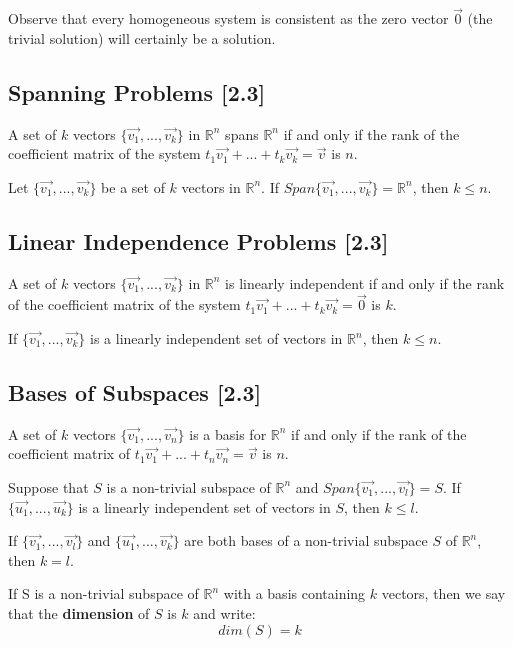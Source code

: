 \documentclass[a4paper,9pt]{extarticle}
\begin{document}
\begin{multicols*}{2}
Observe that every homogeneous system is consistent as the zero vector $\vec{0}$ (the trivial solution) will certainly be a solution.


\subsection{Spanning Problems [2.3]}
A set of $k$ vectors $\{\vec{v_1}, ... ,\vec{v_k}\}$ in $\mathbb{R}^n$ spans $\mathbb{R}^n$ if and only if the rank of the coefficient matrix of the system $t_1 \vec{v_1} + ... + t_k \vec{v_k} = \vec{v}$ is $n$.

Let $\{\vec{v_1}, ... ,\vec{v_k}\}$ be a set of $k$ vectors in $\mathbb{R}^n$. If $Span\{\vec{v_1}, ... ,\vec{v_k}\} = \mathbb{R}^n$, then $k \leq n$.


\subsection{Linear Independence Problems [2.3]}
A set of $k$ vectors $\{\vec{v_1}, ... ,\vec{v_k}\}$ in $\mathbb{R}^n$ is linearly independent if and only if the rank of the coefficient matrix of the system $t_1 \vec{v_1} + ... + t_k \vec{v_k} = \vec{0}$ is $k$.

If $\{\vec{v_1}, ... ,\vec{v_k}\}$ is a linearly independent set of vectors in $\mathbb{R}^n$, then $k \leq n$.


\subsection{Bases of Subspaces [2.3]}
A set of $k$ vectors $\{\vec{v_1}, ... ,\vec{v_n}\}$ is a basis for $\mathbb{R}^n$ if and only if the rank of the coefficient matrix of $t_1 \vec{v_1} + ... + t_n \vec{v_n} = \vec{v}$ is $n$.

Suppose that $S$ is a non-trivial subspace of $\mathbb{R}^n$ and $Span\{\vec{v_1}, ... ,\vec{v_l}\} = S$. If $\{\vec{u_1}, ... ,\vec{u_k}\}$ is a linearly independent set of vectors in $S$, then $k \leq l$.

If $\{\vec{v_1}, ... ,\vec{v_l}\}$ and $\{\vec{u_1}, ... ,\vec{v_k}\}$ are both bases of a non-trivial subspace $S$ of $\mathbb{R}^n$, then $k = l$.

If S is a non-trivial subspace of $\mathbb{R}^n$ with a basis containing $k$ vectors, then we say that the \textbf{dimension} of $S$ is $k$ and write:
$$dim(S) = k$$


\end{multicols*}
\end{document}
